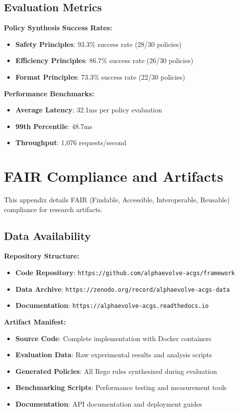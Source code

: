 \documentclass[sigconf,natbib]{acmart}
\begin{document}
\subsection{Evaluation Metrics}
\textbf{Policy Synthesis Success Rates:}
\begin{itemize}
    \item \textbf{Safety Principles}: 93.3\% success rate (28/30 policies)
    \item \textbf{Efficiency Principles}: 86.7\% success rate (26/30 policies)
    \item \textbf{Format Principles}: 73.3\% success rate (22/30 policies)
\end{itemize}

\textbf{Performance Benchmarks:}
\begin{itemize}
    \item \textbf{Average Latency}: 32.1ms per policy evaluation
    \item \textbf{99th Percentile}: 48.7ms
    \item \textbf{Throughput}: 1,076 requests/second
\end{itemize}

\section{FAIR Compliance and Artifacts}
\label{app:artifacts}

This appendix details FAIR (Findable, Accessible, Interoperable, Reusable) compliance for research artifacts.

\subsection{Data Availability}
\textbf{Repository Structure:}
\begin{itemize}
    \item \textbf{Code Repository}: \texttt{https://github.com/alphaevolve-acgs/framework}
    \item \textbf{Data Archive}: \texttt{https://zenodo.org/record/alphaevolve-acgs-data}
    \item \textbf{Documentation}: \texttt{https://alphaevolve-acgs.readthedocs.io}
\end{itemize}

\textbf{Artifact Manifest:}
\begin{itemize}
    \item \textbf{Source Code}: Complete implementation with Docker containers
    \item \textbf{Evaluation Data}: Raw experimental results and analysis scripts
    \item \textbf{Generated Policies}: All Rego rules synthesized during evaluation
    \item \textbf{Benchmarking Scripts}: Performance testing and measurement tools
    \item \textbf{Documentation}: API documentation and deployment guides
\end{itemize}
\end{document}
